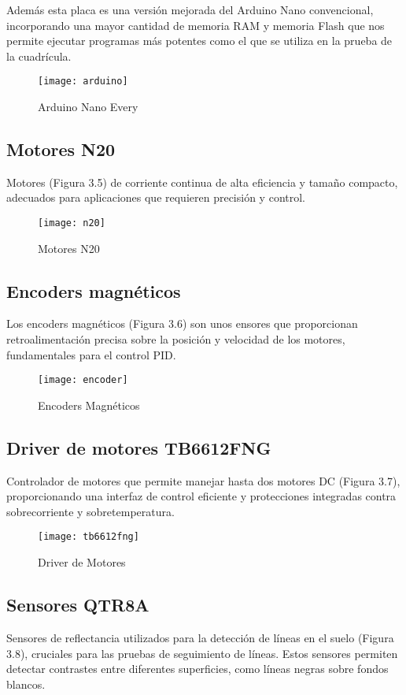 Además esta placa es una versión mejorada del Arduino Nano convencional, incorporando una mayor cantidad de memoria RAM y memoria Flash que nos permite ejecutar programas más potentes como el que se utiliza en la prueba de la cuadrícula.
\begin{figure}[h]
	\centering
	\texttt{[image: arduino]}
	\caption{Arduino Nano Every}
	\label{fig:3.4}
\end{figure}
\newpage
\subsection{Motores N20}\label{N20}
Motores (Figura 3.5) de corriente continua de alta eficiencia y tamaño compacto, adecuados para aplicaciones que requieren precisión y control.
\begin{figure}[h]
	\centering
	\texttt{[image: n20]}
	\caption{Motores N20}
	\label{fig:3.5}
\end{figure}


\subsection{Encoders magnéticos}\label{encoders}
Los encoders magnéticos (Figura 3.6) son unos ensores que proporcionan retroalimentación precisa sobre la posición y velocidad de los motores, fundamentales para el control PID.
\begin{figure}[h]
	\centering
	\texttt{[image: encoder]}
	\caption{Encoders Magnéticos}
	\label{fig:3.6}
\end{figure}

\subsection{Driver de motores TB6612FNG}\label{driver}
Controlador de motores que permite manejar hasta dos motores DC (Figura 3.7), proporcionando una interfaz de control eficiente y protecciones integradas contra sobrecorriente y sobretemperatura.
\begin{figure}[h]
	\centering
	\texttt{[image: tb6612fng]}
	\caption{Driver de Motores}
	\label{fig:3.7}
\end{figure}

\subsection{Sensores QTR8A}\label{qtr8a}
Sensores de reflectancia utilizados para la detección de líneas en el suelo (Figura 3.8), cruciales para las pruebas de seguimiento de líneas. Estos sensores permiten detectar contrastes entre diferentes superficies, como líneas negras sobre fondos blancos. ~\cite{pololuQTR8A}

